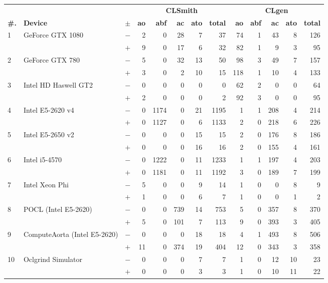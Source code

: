   \begin{tabular}{lll | rrrrr | rrrrr }
  \toprule
  & & & \multicolumn{5}{c|}{\textbf{CLSmith}} & \multicolumn{5}{c}{\textbf{CLgen}} \\
  \textbf{\#.} & \textbf{Device} & $\pm$ &
  \textbf{ao} & \textbf{abf} & \textbf{ac} & \textbf{ato} & \textbf{total} &
  \textbf{ao} & \textbf{abf} & \textbf{ac} & \textbf{ato} & \textbf{total} \\
  \midrule
  \multirow{ 2}{*}{1} & \multirow{ 2}{*}{GeForce GTX 1080} & $-$ & 2 & 0 & 28 & 7 & 37       & 74 & 1 & 43 & 8 & 126 \\& & $+$ & 9 & 0 & 17 & 6 & 32 & 82 & 1 & 9 & 3 & 95 \\
\hline
\multirow{ 2}{*}{2} & \multirow{ 2}{*}{GeForce GTX 780} & $-$ & 5 & 0 & 32 & 13 & 50       & 98 & 3 & 49 & 7 & 157 \\& & $+$ & 3 & 0 & 2 & 10 & 15 & 118 & 1 & 10 & 4 & 133 \\
\hline
\multirow{ 2}{*}{3} & \multirow{ 2}{*}{Intel HD Haswell GT2} & $-$ & 0 & 0 & 0 & 0 & 0       & 62 & 2 & 0 & 0 & 64 \\& & $+$ & 2 & 0 & 0 & 0 & 2 & 92 & 3 & 0 & 0 & 95 \\
\hline
\multirow{ 2}{*}{4} & \multirow{ 2}{*}{Intel E5-2620 v4} & $-$ & 0 & 1174 & 0 & 21 & 1195       & 1 & 1 & 208 & 4 & 214 \\& & $+$ & 0 & 1127 & 0 & 6 & 1133 & 2 & 0 & 218 & 6 & 226 \\
\hline
\multirow{ 2}{*}{5} & \multirow{ 2}{*}{Intel E5-2650 v2} & $-$ & 0 & 0 & 0 & 15 & 15       & 2 & 0 & 176 & 8 & 186 \\& & $+$ & 0 & 0 & 0 & 16 & 16 & 2 & 0 & 155 & 4 & 161 \\
\hline
\multirow{ 2}{*}{6} & \multirow{ 2}{*}{Intel i5-4570} & $-$ & 0 & 1222 & 0 & 11 & 1233       & 1 & 1 & 197 & 4 & 203 \\& & $+$ & 0 & 1181 & 0 & 11 & 1192 & 3 & 0 & 189 & 7 & 199 \\
\hline
\multirow{ 2}{*}{7} & \multirow{ 2}{*}{Intel Xeon Phi} & $-$ & 5 & 0 & 0 & 9 & 14       & 1 & 0 & 0 & 8 & 9 \\& & $+$ & 1 & 0 & 0 & 6 & 7 & 1 & 0 & 0 & 1 & 2 \\
\hline
\multirow{ 2}{*}{8} & \multirow{ 2}{*}{POCL (Intel E5-2620)} & $-$ & 0 & 0 & 739 & 14 & 753       & 5 & 0 & 357 & 8 & 370 \\& & $+$ & 5 & 0 & 101 & 7 & 113 & 9 & 0 & 393 & 3 & 405 \\
\hline
\multirow{ 2}{*}{9} & \multirow{ 2}{*}{ComputeAorta (Intel E5-2620)} & $-$ & 0 & 0 & 0 & 18 & 18       & 4 & 1 & 493 & 8 & 506 \\& & $+$ & 11 & 0 & 374 & 19 & 404 & 12 & 0 & 343 & 3 & 358 \\
\hline
\multirow{ 2}{*}{10} & \multirow{ 2}{*}{Oclgrind Simulator} & $-$ & 0 & 0 & 0 & 7 & 7       & 1 & 0 & 12 & 10 & 23 \\& & $+$ & 0 & 0 & 0 & 3 & 3 & 1 & 0 & 10 & 11 & 22 \\
  \bottomrule
\end{tabular}

